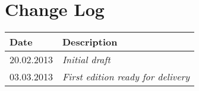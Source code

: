 \section{Change Log}
\label{sec:changelog}
\begin{tabular}{|l|l|}
\hline
Date & Description \\ \hline
20.02.2013 & \emph{Initial draft\/} \\ \hline
03.03.2013 & \emph{First edition ready for delivery\/} \\ \hline
\end{tabular}
